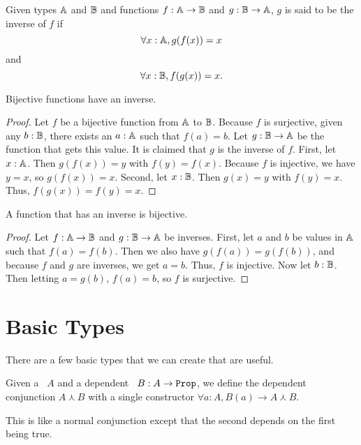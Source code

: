 \documentclass[../math.tex]{subfiles}
\begin{document}
\begin{definition}
    Given types $\mathbb{A}$ and $\mathbb{B}$ and functions $f : \mathbb{A} \rightarrow \mathbb{B}$ and $g : \mathbb{B}
    \rightarrow \mathbb{A}$, $g$ is said to be the inverse of $f$ if
    \[
        \forall x : \mathbb{A}, g(f(x)) = x
    \]
    and
    \[
        \forall x : \mathbb{B}, f(g(x)) = x.
    \]
\end{definition}

\begin{theorem}
    Bijective functions have an inverse.
\end{theorem}
\begin{proof}
    Let $f$ be a bijective function from $\mathbb{A}$ to $\mathbb{B}$.  Because $f$ is
    surjective, given any $b : \mathbb{B}$, there exists an $a : \mathbb{A}$ such that $f(a) =
    b$.  Let $g : \mathbb{B} \rightarrow \mathbb{A}$ be the function that gets this value.  It
    is claimed that $g$ is the inverse of $f$.  First, let $x : \mathbb{A}$.  Then
    $g(f(x)) = y$ with $f(y) = f(x)$.  Because $f$ is injective, we have $y =
    x$, so $g(f(x)) = x$.  Second, let $x : \mathbb{B}$.  Then $g(x) = y$ with $f(y) =
    x$.  Thus, $f(g(x)) = f(y) = x$.
\end{proof}

\begin{instance}
    A function that has an inverse is bijective.
\end{instance}
\begin{proof}
    Let $f : \mathbb{A} \rightarrow \mathbb{B}$ and $g : \mathbb{B} \rightarrow \mathbb{A}$ be inverses.  First,
    let $a$ and $b$ be values in $\mathbb{A}$ such that $f(a) = f(b)$.  Then we also
    have $g(f(a)) = g(f(b))$, and because $f$ and $g$ are inverses, we get $a =
    b$.  Thus, $f$ is injective.  Now let $b : \mathbb{B}$.  Then letting $a = g(b)$,
    $f(a) = b$, so $f$ is surjective.
\end{proof}

\section{Basic Types} \label{sec_types}

There are a few basic types that we can create that are useful.

\begin{definition}
    Given a \Prop\ $A$ and a dependent \Prop\ $B : A \rightarrow \Prop$, we
    define the dependent conjunction $A \curlywedge B$ with a single
    constructor $\forall a : A, B(a) \rightarrow A \curlywedge B$.
\end{definition}

This is like a normal conjunction except that the second \Prop depends on the
first \Prop being true.
\end{document}
